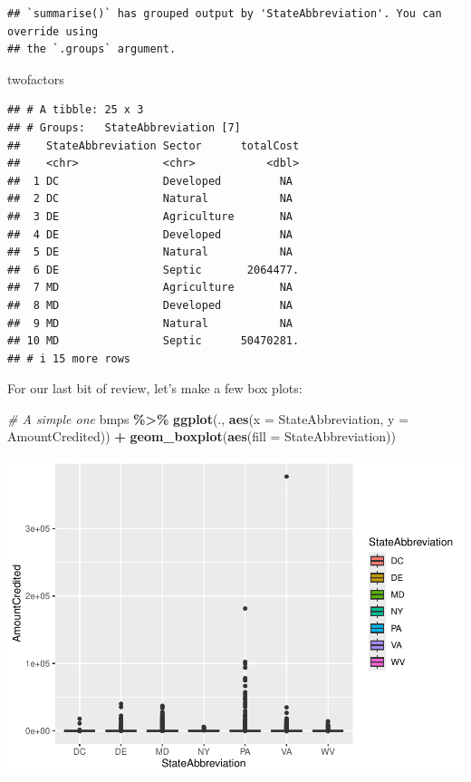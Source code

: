 \documentclass[]{article}
\newenvironment{Shaded}{\begin{snugshade}}{\end{snugshade}}
\newcommand{\AttributeTok}[1]{\textcolor[rgb]{0.13,0.29,0.53}{#1}}
\newcommand{\CommentTok}[1]{\textcolor[rgb]{0.56,0.35,0.01}{\textit{#1}}}
\newcommand{\FunctionTok}[1]{\textcolor[rgb]{0.13,0.29,0.53}{\textbf{#1}}}
\newcommand{\NormalTok}[1]{#1}
\newcommand{\SpecialCharTok}[1]{\textcolor[rgb]{0.81,0.36,0.00}{\textbf{#1}}}
\begin{document}
\begin{verbatim}
## `summarise()` has grouped output by 'StateAbbreviation'. You can override using
## the `.groups` argument.
\end{verbatim}

\begin{Shaded}
\begin{Highlighting}[]
\NormalTok{twofactors}
\end{Highlighting}
\end{Shaded}

\begin{verbatim}
## # A tibble: 25 x 3
## # Groups:   StateAbbreviation [7]
##    StateAbbreviation Sector      totalCost
##    <chr>             <chr>           <dbl>
##  1 DC                Developed         NA 
##  2 DC                Natural           NA 
##  3 DE                Agriculture       NA 
##  4 DE                Developed         NA 
##  5 DE                Natural           NA 
##  6 DE                Septic       2064477.
##  7 MD                Agriculture       NA 
##  8 MD                Developed         NA 
##  9 MD                Natural           NA 
## 10 MD                Septic      50470281.
## # i 15 more rows
\end{verbatim}

For our last bit of review, let's make a few box plots:

\begin{Shaded}
\begin{Highlighting}[]
\CommentTok{\# A simple one}
\NormalTok{bmps }\SpecialCharTok{\%\textgreater{}\%} \FunctionTok{ggplot}\NormalTok{(., }\FunctionTok{aes}\NormalTok{(}\AttributeTok{x =}\NormalTok{ StateAbbreviation, }\AttributeTok{y =}\NormalTok{ AmountCredited)) }\SpecialCharTok{+}
  \FunctionTok{geom\_boxplot}\NormalTok{(}\FunctionTok{aes}\NormalTok{(}\AttributeTok{fill =}\NormalTok{ StateAbbreviation))}
\end{Highlighting}
\end{Shaded}

\includegraphics{lab02_files/figure-latex/review3-1.pdf}
\end{document}
